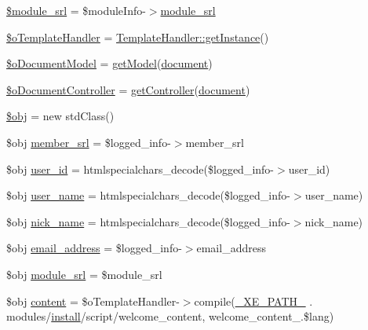 \begin{DoxyCompactItemize}
\item 
\hyperlink{ko_8install_8php_ae40aed4d7a99050245e66ca2a82949ed}{\$module\+\_\+srl} = \$module\+Info-\/$>$\hyperlink{ko_8install_8php_a370bb6450fab1da3e0ed9f484a38b761}{module\+\_\+srl}
\item 
\hyperlink{ko_8install_8php_abd57e3ab220291ea9b5c16c2a4e0670e}{\$o\+Template\+Handler} = \hyperlink{classTemplateHandler_a9745460c5daccfc48abf8652778b2718}{Template\+Handler\+::get\+Instance}()
\item 
\hyperlink{ko_8install_8php_afb18aa87e5520385e76377e876e042af}{\$o\+Document\+Model} = \hyperlink{func_8inc_8php_aecdfcc5332bcf22df01fc21a03b64435}{get\+Model}(\textquotesingle{}\hyperlink{classdocument}{document}\textquotesingle{})
\item 
\hyperlink{ko_8install_8php_aac43fce682d4b7a05df6d3e44c2c54e6}{\$o\+Document\+Controller} = \hyperlink{func_8inc_8php_aa08f01e3bf130d770b373ca8493e3e9b}{get\+Controller}(\textquotesingle{}\hyperlink{classdocument}{document}\textquotesingle{})
\item 
\hyperlink{ko_8install_8php_a9008ed94ba185855b1723e367744b87e}{\$obj} = new std\+Class()
\item 
\$obj \hyperlink{ko_8install_8php_aa61f9e08f0fe505094d26f8143f30bbd}{member\+\_\+srl} = \$logged\+\_\+info-\/$>$member\+\_\+srl
\item 
\$obj \hyperlink{ko_8install_8php_a74f1a394389d774e5b4cd5d1d15413f7}{user\+\_\+id} = htmlspecialchars\+\_\+decode(\$logged\+\_\+info-\/$>$user\+\_\+id)
\item 
\$obj \hyperlink{ko_8install_8php_a115401aff7da80e73c66e9f76505426b}{user\+\_\+name} = htmlspecialchars\+\_\+decode(\$logged\+\_\+info-\/$>$user\+\_\+name)
\item 
\$obj \hyperlink{ko_8install_8php_a151ecae87a1f3d7e257aa089803086bd}{nick\+\_\+name} = htmlspecialchars\+\_\+decode(\$logged\+\_\+info-\/$>$nick\+\_\+name)
\item 
\$obj \hyperlink{ko_8install_8php_a1dffea0d5ba8194f8ef01f414af0c831}{email\+\_\+address} = \$logged\+\_\+info-\/$>$email\+\_\+address
\item 
\$obj \hyperlink{ko_8install_8php_a370bb6450fab1da3e0ed9f484a38b761}{module\+\_\+srl} = \$module\+\_\+srl
\item 
\$obj \hyperlink{ko_8install_8php_a65dddc3e5e47cb506e6b5417ffb3bdef}{content} = \$o\+Template\+Handler-\/$>$compile(\hyperlink{config_8inc_8php_a5387c7a3f2aa38adf16f324cee88db88}{\+\_\+\+X\+E\+\_\+\+P\+A\+T\+H\+\_\+} . \textquotesingle{}modules/\hyperlink{classinstall}{install}/script/welcome\+\_\+content\textquotesingle{}, \textquotesingle{}welcome\+\_\+content\+\_\+\textquotesingle{}.\$lang)

\end{DoxyCompactItemize}
